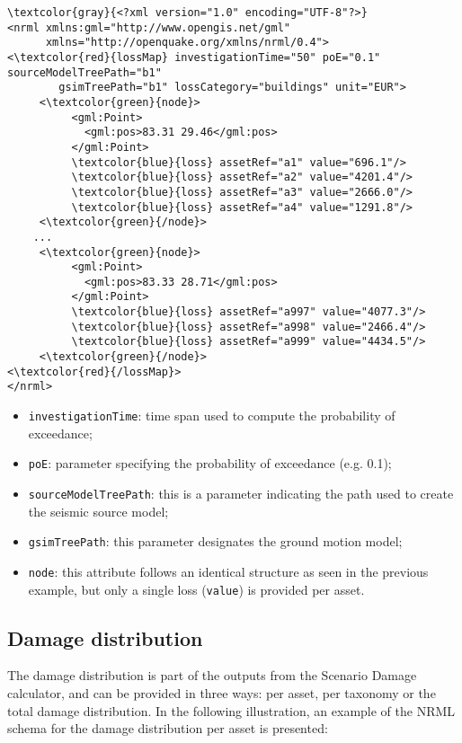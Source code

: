 \begin{Verbatim}[frame=single, commandchars=\\\{\}, samepage=false]
\textcolor{gray}{<?xml version="1.0" encoding="UTF-8"?>}
<nrml xmlns:gml="http://www.opengis.net/gml"
      xmlns="http://openquake.org/xmlns/nrml/0.4">
<\textcolor{red}{lossMap} investigationTime="50" poE="0.1" sourceModelTreePath="b1"
        gsimTreePath="b1" lossCategory="buildings" unit="EUR">
     <\textcolor{green}{node}>
          <gml:Point>
            <gml:pos>83.31 29.46</gml:pos>
          </gml:Point>
          \textcolor{blue}{loss} assetRef="a1" value="696.1"/>
          \textcolor{blue}{loss} assetRef="a2" value="4201.4"/>
          \textcolor{blue}{loss} assetRef="a3" value="2666.0"/>
          \textcolor{blue}{loss} assetRef="a4" value="1291.8"/>
     <\textcolor{green}{/node}>
    ...
     <\textcolor{green}{node}>
          <gml:Point>
            <gml:pos>83.33 28.71</gml:pos>
          </gml:Point>
          \textcolor{blue}{loss} assetRef="a997" value="4077.3"/>
          \textcolor{blue}{loss} assetRef="a998" value="2466.4"/>
          \textcolor{blue}{loss} assetRef="a999" value="4434.5"/>
     <\textcolor{green}{/node}>
<\textcolor{red}{/lossMap}>
</nrml>
\end{Verbatim}

\begin{itemize}
\item  \Verb+investigationTime+: time span used to compute the probability of exceedance;
\item  \Verb+poE+: parameter specifying the probability of exceedance (e.g. 0.1);
\item  \Verb+sourceModelTreePath+: this is a parameter indicating the path used to create the seismic source model;
\item  \Verb+gsimTreePath+: this parameter designates the ground motion model;
\item  \Verb+node+: this attribute follows an identical structure as seen in the previous example, but only a single loss (\Verb+value+) is provided per \gls{asset}.
\end{itemize}

\subsection{Damage distribution}
The damage distribution is part of the outputs from the Scenario Damage calculator, and can be provided in three ways: per \gls{asset}, per taxonomy or the total damage distribution. In the following illustration, an example of the NRML schema for the damage distribution per \gls{asset} is presented: 

